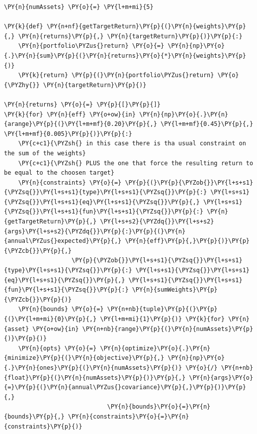     \begin{tcolorbox}[breakable, size=fbox, boxrule=1pt, pad at break*=1mm,colback=cellbackground, colframe=cellborder]
\begin{Verbatim}[commandchars=\\\{\}]
\PY{n}{numAssets} \PY{o}{=} \PY{l+m+mi}{5}

\PY{k}{def} \PY{n+nf}{getTargetReturn}\PY{p}{(}\PY{n}{weights}\PY{p}{,} \PY{n}{returns}\PY{p}{,} \PY{n}{targetReturn}\PY{p}{)}\PY{p}{:}
    \PY{n}{portfolio\PYZus{}return} \PY{o}{=} \PY{n}{np}\PY{o}{.}\PY{n}{sum}\PY{p}{(}\PY{n}{returns}\PY{o}{*}\PY{n}{weights}\PY{p}{)}
    \PY{k}{return} \PY{p}{(}\PY{n}{portfolio\PYZus{}return} \PY{o}{\PYZhy{}} \PY{n}{targetReturn}\PY{p}{)}

\PY{n}{returns} \PY{o}{=} \PY{p}{[}\PY{p}{]}
\PY{k}{for} \PY{n}{eff} \PY{o+ow}{in} \PY{n}{np}\PY{o}{.}\PY{n}{arange}\PY{p}{(}\PY{l+m+mf}{0.20}\PY{p}{,} \PY{l+m+mf}{0.45}\PY{p}{,} \PY{l+m+mf}{0.005}\PY{p}{)}\PY{p}{:}
    \PY{c+c1}{\PYZsh{} in this case there is tha usual constraint on the sum of the weights}
    \PY{c+c1}{\PYZsh{} PLUS the one that force the resulting return to be equal to the choosen target}
    \PY{n}{constraints} \PY{o}{=} \PY{p}{(}\PY{p}{\PYZob{}}\PY{l+s+s1}{\PYZsq{}}\PY{l+s+s1}{type}\PY{l+s+s1}{\PYZsq{}}\PY{p}{:} \PY{l+s+s1}{\PYZsq{}}\PY{l+s+s1}{eq}\PY{l+s+s1}{\PYZsq{}}\PY{p}{,} \PY{l+s+s1}{\PYZsq{}}\PY{l+s+s1}{fun}\PY{l+s+s1}{\PYZsq{}}\PY{p}{:} \PY{n}{getTargetReturn}\PY{p}{,} \PY{l+s+s2}{\PYZdq{}}\PY{l+s+s2}{args}\PY{l+s+s2}{\PYZdq{}}\PY{p}{:}\PY{p}{(}\PY{n}{annual\PYZus{}expected}\PY{p}{,} \PY{n}{eff}\PY{p}{,}\PY{p}{)}\PY{p}{\PYZcb{}}\PY{p}{,}
                   \PY{p}{\PYZob{}}\PY{l+s+s1}{\PYZsq{}}\PY{l+s+s1}{type}\PY{l+s+s1}{\PYZsq{}}\PY{p}{:} \PY{l+s+s1}{\PYZsq{}}\PY{l+s+s1}{eq}\PY{l+s+s1}{\PYZsq{}}\PY{p}{,} \PY{l+s+s1}{\PYZsq{}}\PY{l+s+s1}{fun}\PY{l+s+s1}{\PYZsq{}}\PY{p}{:} \PY{n}{sumWeights}\PY{p}{\PYZcb{}}\PY{p}{)}
    \PY{n}{bounds} \PY{o}{=} \PY{n+nb}{tuple}\PY{p}{(}\PY{p}{(}\PY{l+m+mi}{0}\PY{p}{,} \PY{l+m+mi}{1}\PY{p}{)} \PY{k}{for} \PY{n}{asset} \PY{o+ow}{in} \PY{n+nb}{range}\PY{p}{(}\PY{n}{numAssets}\PY{p}{)}\PY{p}{)}
    \PY{n}{opts} \PY{o}{=} \PY{n}{optimize}\PY{o}{.}\PY{n}{minimize}\PY{p}{(}\PY{n}{objective}\PY{p}{,} \PY{n}{np}\PY{o}{.}\PY{n}{ones}\PY{p}{(}\PY{n}{numAssets}\PY{p}{)} \PY{o}{/} \PY{n+nb}{float}\PY{p}{(}\PY{n}{numAssets}\PY{p}{)}\PY{p}{,} \PY{n}{args}\PY{o}{=}\PY{p}{(}\PY{n}{annual\PYZus{}covariance}\PY{p}{,}\PY{p}{)}\PY{p}{,}
                             \PY{n}{bounds}\PY{o}{=}\PY{n}{bounds}\PY{p}{,} \PY{n}{constraints}\PY{o}{=}\PY{n}{constraints}\PY{p}{)}


\end{Verbatim}
\end{tcolorbox}
